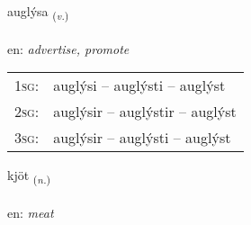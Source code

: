 \documentclass[frontgrid, backgrid]{flacards}\usepackage[]{graphicx}\usepackage[]{color}
\begin{document}
\renewcommand{\flhead}{\vskip5pt \fboxsep=0pt {\small\bfseries\footnotesize Sagnorð | Verb}}
\renewcommand{\fcfoot}{\vskip5pt \fboxsep=0pt \hspace{2pt}{\small\bfseries\footnotesize 2K}}

\renewcommand{\blhead}{\vskip5pt {\small\bfseries\footnotesize Sagnorð | Verb }}
\renewcommand{\bcfoot}{\vskip5pt \hspace{2pt}{\small\bfseries\footnotesize 2K}}


{auglýsa \small{\textsubscript{(\textit{v.})}} \\[1ex] %
\textphonetic{[œiɣlisa]} \\
en: \emph{advertise, promote} \\  [2ex]
\renewcommand*{\arraystretch}{0.8}
\begin{tabular}{p{1cm}l}
\textsc{1sg}: & auglýsi -- auglýsti -- auglýst \\ 
\textsc{2sg}: & auglýsir -- auglýstir -- auglýst \\ 
\textsc{3sg}: & auglýsir -- auglýsti -- auglýst \\ 
\end{tabular}
}

\renewcommand{\flhead}{\vskip5pt \fboxsep=0pt {\small\bfseries\footnotesize Nafnorð | Noun}}
\renewcommand{\fcfoot}{\vskip5pt \fboxsep=0pt \hspace{2pt}{\small\bfseries\footnotesize 2K}}

\renewcommand{\blhead}{\vskip5pt {\small\bfseries\footnotesize Nafnorð | Noun }}
\renewcommand{\bcfoot}{\vskip5pt \hspace{2pt}{\small\bfseries\footnotesize 2K}}


{kjöt \small{\textsubscript{(\textit{n.})}} \\[1ex] %
\textphonetic{[cʰœːt]} \\
en: \emph{meat} \\  [2ex]
\renewcommand*{\arraystretch}{0.8}
}
\end{document}

